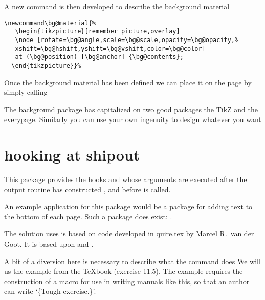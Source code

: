 \begin{teXXX}
  \def\bg@contents{Draft}
  \def\bg@color{red!45}
  \def\bg@angle{60}
  \def\bg@opacity{.5}
  \def\bg@scale{15}
  \def\bg@position{current page.center}
  \def\bg@anchor{}
  \def\bg@hshift{0}
  \def\bg@vshift{0}
\end{teXXX}

A new command is then developed to describe the background material

\begin{verbatim}
\newcommand\bg@material{%
   \begin{tikzpicture}[remember picture,overlay]
   \node [rotate=\bg@angle,scale=\bg@scale,opacity=\bg@opacity,%
   xshift=\bg@hshift,yshift=\bg@vshift,color=\bg@color]
   at (\bg@position) [\bg@anchor] {\bg@contents};
  \end{tikzpicture}}%
\end{verbatim}

Once the background material has been defined we can place it on the page by simply calling

\begin{teXXX}
   \newcommand\BgThispage{\AddThispageHook{\bg@material}}
\end{teXXX}

The background package has capitalized on two good packages the TikZ and the everypage. Similarly you can use your own ingenuity to design whatever you want


\section{hooking at shipout}
\let\package\docpkg
\let\cs\doccmd

This package provides the hooks  and 
   whose arguments are executed after the output 
  routine has constructed , and before  is 
  called.

  An example application for this package would be a package for
  adding text to the bottom of each page.
  Such a package does exist: \cite{package!prelim2e}.

The solution  uses is based on code developed in  \textsf{quire.tex} by
 Marcel R.~van der Goot.  It is based upon \cs{afterassignment} and .



A bit of a diversion here is necessary to describe what the command  does
We will us the example from the TeXbook (exercise 11.5). The example requires
the construction of  a  macro for use in writing manuals like this, so that an
author can write `\{Tough exercise.\}'. 



